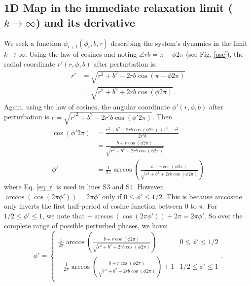 \setcounter{equation}{0}
\setcounter{figure}{0}
\setcounter{table}{0}
\setcounter{page}{1}
\makeatletter

\renewcommand{\theequation}{S\arabic{equation}}
\renewcommand{\thefigure}{S\arabic{figure}}

\subsection{1D Map in the immediate relaxation limit ($k\rightarrow\infty$) and its derivative} \label{supp: sub1}
We seek a function $\phi_{i+1}(\phi_i, b, \tau)$ describing the system's dynamics in the limit $k\rightarrow\infty$. Using the law of cosines and noting $\angle{rb}= \pi-\phi 2\pi$ (see Fig. \ref{osc}), the radial coordinate $r'(r,\phi,b)$ after perturbation is:
\begin{align}
    r'&=\sqrt{r^2+b^2-2rb\cos(\pi-\phi 2\pi)}\\
     &=\sqrt{r^2+b^2+2rb\cos(\phi 2\pi)} 
     \label{eq: r}.
\end{align}
Again, using the law of cosines, the angular coordinate $\phi'(r,\phi,b)$ after perturbation is $r =\sqrt{r'^2+b^2-2r'b\cos(\phi' 2\pi)}$. Then 
\begin{align}
    \cos(\phi' 2\pi) &= \frac{r^2+b^2+2rb\cos(\phi 2\pi) +b^2 - r^2}{2r'b} \\
    &= \frac{b+r \cos(\phi 2\pi)}{\sqrt{r^2+b^2+2rb\cos(\phi 2\pi)}} \\
    \phi' &= \frac{1}{2\pi}\arccos(\frac{b+r \cos(\phi 2\pi)}{\sqrt{r^2+b^2+2rb\cos(\phi 2\pi)}})
\end{align} where Eq. \ref{eq: r} is used in lines S3 and S4. However, $\arccos(\cos(2\pi \phi')) = 2\pi \phi'$ only if $0\leq \phi' \leq 1/2$. This is because arccosine only inverts the first half-period of cosine function between $0$ to $\pi$. For $1/2 \leq \phi' \leq 1$, we note that $-\arccos(\cos(2\pi \phi')) +2\pi= 2\pi \phi'$. So over the complete range of possible perturbed phases, we have:
\begin{equation}
    \phi' =
    \begin{cases}
     \frac{1}{2\pi}\arccos(\frac{b+r \cos(\phi 2\pi)}{\sqrt{r^2+b^2+2rb\cos(\phi 2\pi)}}) & 0 \leq \phi' \leq 1/2 \\
    -\frac{1}{2\pi}\arccos(\frac{b+r \cos(\phi 2\pi)}{\sqrt{r^2+b^2+2rb\cos(\phi 2\pi)}}) + 1 & 1/2 \leq \phi' \leq 1 \\
    \end{cases}.
\end{equation}
